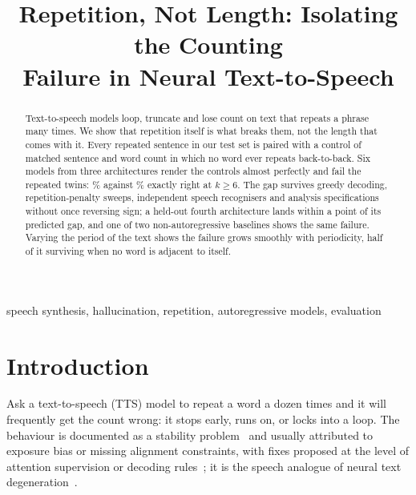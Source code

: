 \documentclass{article}
\title{Repetition, Not Length: Isolating the Counting\\
       Failure in Neural Text-to-Speech}
\begin{document}
\maketitle
\def\baselinestretch{.95}\normalsize

\begin{abstract}
Text-to-speech models loop, truncate and lose count on text that repeats a
phrase many times. We show that repetition itself is what breaks them, not
the length that comes with it. Every repeated sentence in our test set is
paired with a control of matched sentence and word count in which no word
ever repeats back-to-back. Six models from three architectures render the
controls almost perfectly and fail the repeated twins: \ExactCtl{}\%
against \ExactRep{}\% exactly right at $k\ge6$. The gap survives greedy
decoding, repetition-penalty sweeps, \IndNJudges{} independent speech
recognisers and \SpecN{} analysis specifications without once reversing
sign; a held-out fourth architecture lands within a point of its predicted
gap, and one of two non-autoregressive baselines shows the same failure.
Varying the period of the text shows the failure grows smoothly with
periodicity, half of it surviving when no word is adjacent to itself.
\end{abstract}

\begin{keywords}
speech synthesis, hallucination, repetition, autoregressive models, evaluation
\end{keywords}

\section{Introduction}
\label{sec:intro}

Ask a text-to-speech (TTS) model to repeat a word a dozen times and it
will frequently get the count wrong: it stops early, runs on, or locks
into a loop. The behaviour is documented as a stability
problem~\cite{song2024ellav,wang2023valle} and usually attributed to
exposure bias or missing alignment constraints, with fixes proposed at the
level of attention supervision or decoding
rules~\cite{xin2024ralle,du2024cosyvoice2,chen2024valle2}; it is the
speech analogue of neural text
degeneration~\cite{holtzman2020curious,welleck2020neural}.
\end{document}
